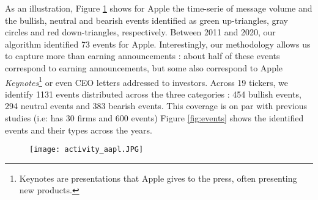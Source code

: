 As an illustration, Figure \ref{fig:activityaapl} shows for Apple the time-serie of message volume and the bullish, neutral and bearish events identified as green up-triangles, gray circles and red down-triangles, respectively. Between 2011 and 2020, our algorithm identified 73 events for Apple. Interestingly, our methodology allows us to capture more than earning announcements : about half of these events correspond to earning announcements, but some also correspond to Apple \textit{Keynotes}\footnote{Keynotes are presentations that Apple gives to the press, often presenting new products.} or even CEO letters addressed to investors. Across 19 tickers, we identify 1131 events distributed across the three categories : 454 bullish events, 294 neutral events and 383 bearish events. This coverage is on par with previous studies (i.e: \citet{mackinlay1997event} has 30 firms and 600 events) Figure \ref{fig:events} shows the identified events and their types across the years.

\begin{figure}[]
    \centering
    \texttt{[image: activity\_aapl.JPG]}
    \label{fig:activityaapl}
\end{figure}

